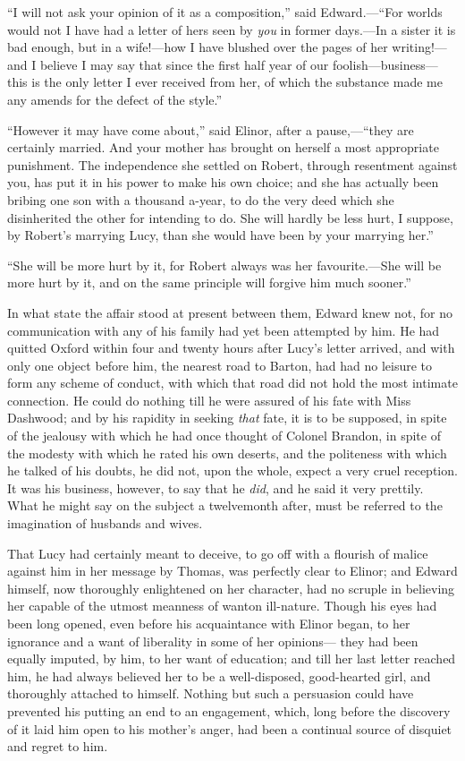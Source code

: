 ``I will not ask your opinion of it as a composition,''
said Edward.---``For worlds would not I have had a letter
of hers seen by \emph{you} in former days.---In a sister it
is bad enough, but in a wife!---how I have blushed over
the pages of her writing!---and I believe I may say that
since the first half year of our foolish---business---this
is the only letter I ever received from her, of which
the substance made me any amends for the defect of the style.''

``However it may have come about,'' said Elinor,
after a pause,---``they are certainly married.  And your mother
has brought on herself a most appropriate punishment.
The independence she settled on Robert, through resentment
against you, has put it in his power to make his own choice;
and she has actually been bribing one son with a thousand
a-year, to do the very deed which she disinherited the
other for intending to do.  She will hardly be less hurt,
I suppose, by Robert's marrying Lucy, than she would have
been by your marrying her.''

``She will be more hurt by it, for Robert always
was her favourite.---She will be more hurt by it,
and on the same principle will forgive him much sooner.''

In what state the affair stood at present between them,
Edward knew not, for no communication with any of his family
had yet been attempted by him.  He had quitted Oxford
within four and twenty hours after Lucy's letter arrived,
and with only one object before him, the nearest road
to Barton, had had no leisure to form any scheme of conduct,
with which that road did not hold the most intimate connection.
He could do nothing till he were assured of his fate with
Miss Dashwood; and by his rapidity in seeking \emph{that} fate,
it is to be supposed, in spite of the jealousy with
which he had once thought of Colonel Brandon, in spite
of the modesty with which he rated his own deserts,
and the politeness with which he talked of his doubts,
he did not, upon the whole, expect a very cruel reception.
It was his business, however, to say that he \emph{did}, and he
said it very prettily.  What he might say on the subject
a twelvemonth after, must be referred to the imagination
of husbands and wives.

That Lucy had certainly meant to deceive, to go off
with a flourish of malice against him in her message
by Thomas, was perfectly clear to Elinor; and Edward himself,
now thoroughly enlightened on her character, had no
scruple in believing her capable of the utmost meanness
of wanton ill-nature. Though his eyes had been long opened,
even before his acquaintance with Elinor began, to her
ignorance and a want of liberality in some of her opinions---%
they had been equally imputed, by him, to her want
of education; and till her last letter reached him,
he had always believed her to be a well-disposed,
good-hearted girl, and thoroughly attached to himself.
Nothing but such a persuasion could have prevented
his putting an end to an engagement, which, long before
the discovery of it laid him open to his mother's anger,
had been a continual source of disquiet and regret to him.

